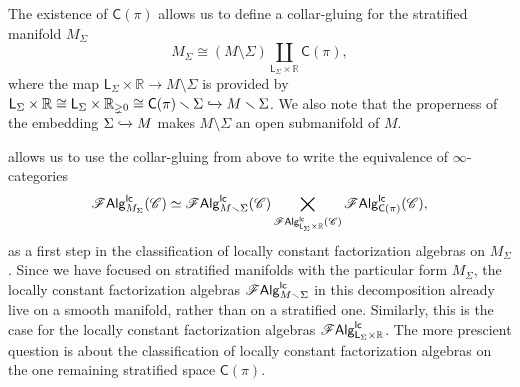 \documentclass[../text]{subfiles}
\begin{document}
\begin{construction}
    The existence of $\mathsf{C}(\pi)$ allows us to define a collar-gluing for the stratified manifold $M_\Sigma$
    \begin{equation}\label{eq:M_Sigma_decomposition}
        M_\Sigma \cong \left( M \setminus \Sigma \right) \coprod_{\mathsf{L}_\Sigma \times \mathbb{R}} \mathsf{C}(\pi),
    \end{equation}
    where the map $\mathsf{L}_\Sigma \times \mathbb{R} \rightarrow M \setminus \Sigma$ is provided by $\mathsf{L}_\Sigma \times \mathbb{R} \cong \mathsf{L}_\Sigma \times \mathbb{R}_{\gneq 0} \cong \mathsf{C}(\pi) \setminus \Sigma \xhookrightarrow{} M \setminus \Sigma$. We also note that the properness of the embedding $\Sigma \xhookrightarrow{} M$ makes $M \setminus \Sigma$ an open submanifold of $M$.
\end{construction}


 allows us to use the collar-gluing from above to write the equivalence of $\infty$-categories
%
\begin{equation}
    \lcfa_{M_\Sigma} (\catC) \simeq \lcfa_{M \setminus \Sigma} (\catC) \bigtimes_{\lcfa_{\mathsf{L}_\Sigma \times \mathbb{R}} (\catC)} \lcfa_{\mathsf{C}(\pi)} (\catC),
\end{equation}
%
as a first step in the classification of locally constant factorization algebras on $M_{\Sigma}$. Since we have focused on stratified manifolds with the particular form $M_{\Sigma}$, the locally constant factorization algebras $\lcfa_{M \setminus \Sigma}$ in this decomposition already live on a smooth manifold, rather than on a stratified one. Similarly, this is the case for the locally constant factorization algebras $\lcfa_{\mathsf{L}_\Sigma \times \mathbb{R}}$. The more prescient question is about the classification of locally constant factorization algebras on the one remaining stratified space $\mathsf{C}(\pi)$. 



\end{document}
